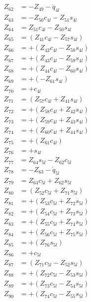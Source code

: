 \begin{multicols}{2}
\begin{align}
Z_{62} &=                   - Z_{49} - \dot{q}_{4l} \nonumber \\
Z_{63} &= - Z_{50}c_{4l} - Z_{51}s_{4l} \nonumber \\
Z_{64} &=   Z_{51}c_{4l} - Z_{50}s_{4l} \nonumber \\
Z_{65} &= (Z_{41}c_{4l} - Z_{57}s_{4l}) \nonumber \\ 
Z_{66} &= + (Z_{42}c_{4l} - Z_{58}s_{4l}) \nonumber \\
Z_{67} &= + (Z_{43}c_{4l} - Z_{59}s_{4l}) \nonumber \\
Z_{68} &= + (Z_{44}c_{4l} - Z_{60}s_{4l}) \nonumber \\
Z_{69} &= + (-Z_{61}s_{4l}) \nonumber \\ 
Z_{70} &= + c_{4l} \nonumber \\
Z_{71} &= (Z_{57}c_{4l} + Z_{41}s_{4l}) \nonumber \\
Z_{72} &= + (Z_{58}c_{4l} + Z_{42}s_{4l}) \nonumber \\
Z_{73} &= + (Z_{59}c_{4l} + Z_{43}s_{4l}) \nonumber \\
Z_{74} &= + (Z_{60}c_{4l} + Z_{44}s_{4l}) \nonumber \\
Z_{75} &= + (Z_{61}c_{4l}) \nonumber \\ 
Z_{76} &= + s_{4l} \nonumber \\
Z_{77} &=  Z_{64}s_{5l} - Z_{62}c_{5l} \nonumber \\
Z_{78} &=                 - Z_{63} - \dot{q}_{5l} \nonumber \\
Z_{79} &= Z_{64}c_{5l} + Z_{62}s_{5l} \nonumber \\
Z_{80} &= (Z_{52}c_{5l} + Z_{71}s_{5l}) \nonumber \\
Z_{81} &= + (Z_{53}c_{5l} + Z_{72}s_{5l}) \nonumber \\
Z_{82} &= + (Z_{54}c_{5l} + Z_{73}s_{5l}) \nonumber \\
Z_{83} &= + (Z_{55}c_{5l} + Z_{74}s_{5l}) \nonumber \\
Z_{84} &= + (Z_{56}c_{5l} + Z_{75}s_{5l}) \nonumber \\
Z_{85} &= + (Z_{76}s_{5l}) \nonumber \\
Z_{86} &= + c_{5l} \nonumber \\
Z_{87} &= (Z_{71}c_{5l} - Z_{52}s_{5l}) \nonumber \\
Z_{88} &= + (Z_{72}c_{5l} - Z_{53}s_{5l}) \nonumber \\
Z_{89} &= + (Z_{73}c_{5l} - Z_{54}s_{5l}) \nonumber \\
Z_{90} &= + (Z_{74}c_{5l} - Z_{55}s_{5l}) \nonumber \\

\end{align}
\end{multicols}
